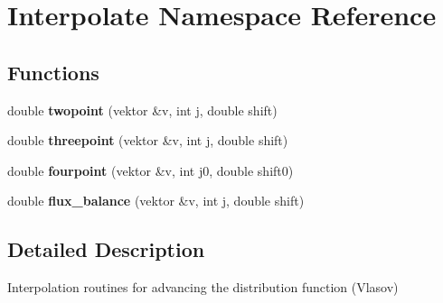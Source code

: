 \section{Interpolate Namespace Reference}
\label{namespaceInterpolate}


\subsection*{Functions}
\begin{CompactItemize}
\item 
double \textbf{twopoint} (vektor \&v, int j, double shift)\label{namespaceInterpolate_0e360bc943bf4502451005135ba06d10}

\item 
double \textbf{threepoint} (vektor \&v, int j, double shift)\label{namespaceInterpolate_a30b0b95000bc4065aeb645e3961eabc}

\item 
double \textbf{fourpoint} (vektor \&v, int j0, double shift0)\label{namespaceInterpolate_19729681bed74ec0a3773a358f2a2577}

\item 
double \textbf{flux\_\-balance} (vektor \&v, int j, double shift)\label{namespaceInterpolate_cfe0062fd81495d3a00bf9dead43e227}

\end{CompactItemize}


\subsection{Detailed Description}
Interpolation routines for advancing the distribution function (Vlasov) 